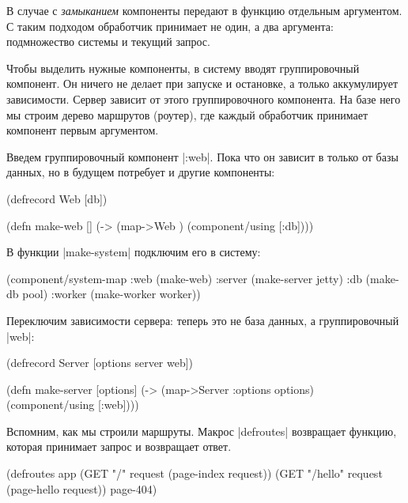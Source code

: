 В случае с \emph{замыканием} компоненты передают в функцию отдельным
аргументом. С таким подходом обработчик принимает не один, а два аргумента:
подмножество системы и текущий запрос.

Чтобы выделить нужные компоненты, в систему вводят группировочный компонент. Он
ничего не делает при запуске и остановке, а только аккумулирует
зависимости. Сервер зависит от этого группировочного компонента. На базе него мы
строим дерево маршрутов (роутер), где каждый обработчик принимает компонент
первым аргументом.

Введем группировочный компонент \spverb|:web|. Пока что он зависит в только от
базы данных, но в будущем потребует и другие компоненты:

\begin{english}
  \begin{clojure}
(defrecord Web [db])

(defn make-web []
  (-> (map->Web {})
      (component/using [:db])))
  \end{clojure}
\end{english}

В функции \spverb|make-system| подключим его в систему:

\begin{english}
  \begin{clojure}
(component/system-map
 :web    (make-web)
 :server (make-server jetty)
 :db     (make-db pool)
 :worker (make-worker worker))
  \end{clojure}
\end{english}

Переключим зависимости сервера: теперь это не база данных, а группировочный
\spverb|web|:

\begin{english}
  \begin{clojure}
(defrecord Server
  [options server web])

(defn make-server
  [options]
  (-> (map->Server {:options options})
      (component/using [:web])))
  \end{clojure}
\end{english}

Вспомним, как мы строили маршруты. Макрос \spverb|defroutes| возвращает функцию,
которая принимает запрос и возвращает ответ.

\begin{english}
  \begin{clojure}
(defroutes app
  (GET "/"      request (page-index request))
  (GET "/hello" request (page-hello request))
  page-404)
  \end{clojure}
\end{english}

